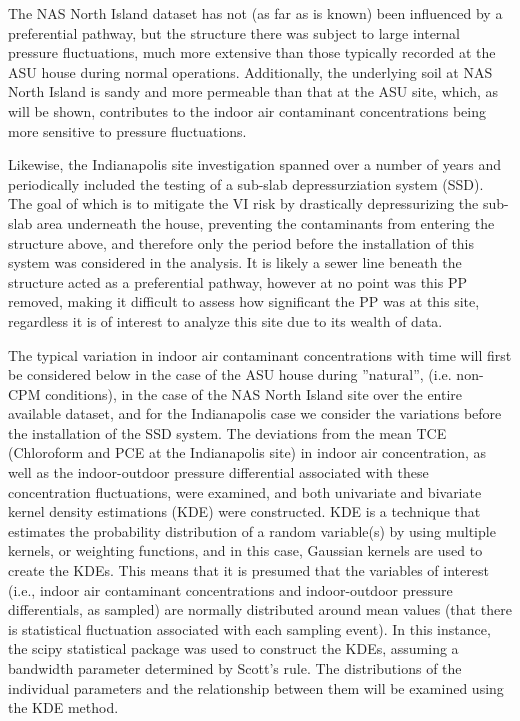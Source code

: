 \documentclass[journal=esthag,manuscript=article]{achemso}
\begin{document}
The NAS North Island dataset has not (as far as is known) been influenced by a preferential pathway, but the structure there was subject to large internal pressure fluctuations, much more extensive than those typically recorded at the ASU house during normal operations.
Additionally, the underlying soil at NAS North Island is sandy and more permeable than that at the ASU site, which, as will be shown, contributes to the indoor air contaminant concentrations being more sensitive to pressure fluctuations\cite{hosangadi_high-frequency_2017}. \par

Likewise, the Indianapolis site investigation spanned over a number of years and periodically included the testing of a sub-slab depressurziation system (SSD).
The goal of which is to mitigate the VI risk by drastically depressurizing the sub-slab area underneath the house, preventing the contaminants from entering the structure above, and therefore only the period before the installation of this system was considered in the analysis.
It is likely a sewer line beneath the structure acted as a preferential pathway\cite{mchugh_evidence_2017}, however at no point was this PP removed, making it difficult to assess how significant the PP was at this site, regardless it is of interest to analyze this site due to its wealth of data. \par

The typical variation in indoor air contaminant concentrations with time will first be considered below in the case of the ASU house during ”natural”, (i.e. non-CPM conditions), in the case of the NAS North Island site over the entire available dataset, and for the Indianapolis case we consider the variations before the installation of the SSD system.
The deviations from the mean TCE (Chloroform and PCE at the Indianapolis site) in indoor air concentration, as well as the indoor-outdoor pressure differential associated with these concentration fluctuations, were examined, and both univariate and bivariate kernel density estimations (KDE) were constructed.
KDE is a technique that estimates the probability distribution of a random variable(s) by using multiple kernels, or weighting functions, and in this case, Gaussian kernels are used to create the KDEs.
This means that it is presumed that the variables of interest (i.e., indoor air contaminant concentrations and indoor-outdoor pressure differentials, as sampled) are normally distributed around mean values (that there is statistical fluctuation associated with each sampling event).
In this instance, the scipy statistical package was used to construct the KDEs, assuming a bandwidth parameter determined by Scott's rule.
The distributions of the individual parameters and the relationship between them will be examined using the KDE method.
\end{document}
